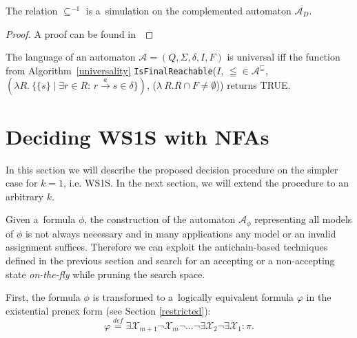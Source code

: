 \begin{lemma}\label{simulation-in-ca}
The relation $\subseteq^{-1}$ is a~simulation on the complemented automaton
$\overline{\mathcal{A}_D}$.
\end{lemma}
\begin{proof}
 A proof can be found in~\cite{raskin}
\end{proof}

\begin{lemma}
The language of an automaton $\mathcal{A} = (Q, \Sigma, \delta, I, F)$ is
universal iff the function from
Algorithm~\ref{universality} \texttt{IsFinalReachable}($I$, $\leqq \in \mathcal{A}^\sqsubseteq$,
 $(\lambda R.\ \{\{s\} \mid \exists r \in R:\, r \overset{a}{\longrightarrow} s
 \in \delta\})$, ($\lambda\ R.
 R \cap F \neq \emptyset$)) returns
\textsc{TRUE}.
\end{lemma}

\section{Deciding WS1S with NFAs}

In this section we will describe the proposed decision procedure on the simpler
case for $k = 1$, i.e. WS1S. In the next section, we will extend the procedure
to an arbitrary $k$.

Given a~formula $\phi$, the construction of the automaton $\mathcal{A}_\phi$
representing all models of $\phi$ is not always necessary and in many
applications any model or an invalid assignment suffices.
Therefore we can exploit the antichain-based techniques defined in the previous
section and search for an accepting or a non-accepting state \emph{on-the-fly}
while pruning the search space.

First, the formula $\phi$ is transformed to a~logically equivalent formula
$\varphi$ in the existential prenex form (see Section \ref{restricted}):
\begin{equation*}
 \varphi \overset{\mathit{def}}{=}
 \exists\mathcal{X}_{m+1}\neg\mathcal{X}_m\neg\ldots\neg\exists\mathcal{X}_2\neg\exists\mathcal{X}_1
 :
 \pi.
\end{equation*}

